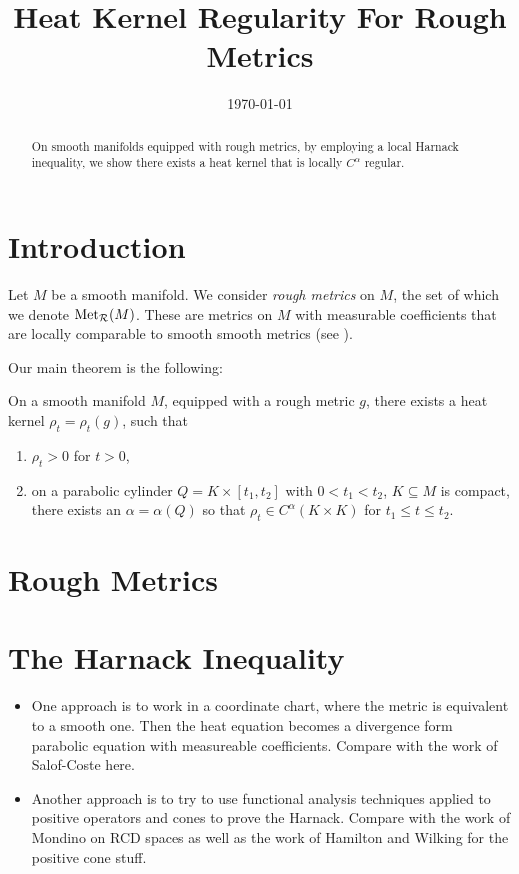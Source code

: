 \documentclass{amsart}
\begin{document}
\title[Heat Kernel Regularity]
 {Heat Kernel Regularity For Rough Metrics}

\curraddr{}
\email{}
\date{\today}

\dedicatory{}
\subjclass[2010]{}
\keywords{}

\begin{abstract}
On smooth manifolds equipped with rough metrics, by employing a local Harnack inequality, we show there exists a heat kernel that is locally $C^{\alpha}$ regular.
\end{abstract}

\maketitle

\section{Introduction}
\label{sec:intro}

Let \(M\) be a smooth manifold. We consider \emph{rough metrics} on \(M\), the set of which we denote \(\operatorname{Met}_{\operatorname{\mathcal{R}}} (M)\). These are metrics on \(M\) with measurable coefficients that are locally comparable to smooth smooth metrics (see ).

Our main theorem is the following:

\begin{thm}
On a smooth manifold \(M\), equipped with a rough metric \(g\), there exists a heat kernel \(\rho_t = \rho_t(g)\), such that
\begin{enumerate}
\item \(\rho_t > 0\) for \(t > 0\),
\item on a parabolic cylinder \(Q = K \times [t_1, t_2]\) with \(0 < t_1 < t_2\), \(K \subseteq M\) is compact, there exists an \(\alpha = \alpha(Q)\) so that \(\rho_t \in C^{\alpha}(K \times K)\) for \(t_1 \leq t \leq t_2\).
\end{enumerate}
\end{thm}

\section{Rough Metrics}
\label{sec:rough_metrics}


\section{The Harnack Inequality}
\label{sec:harnack}

\begin{itemize}
\item One approach is to work in a coordinate chart, where the metric is equivalent to a smooth one. Then the heat equation becomes a divergence form parabolic equation with measureable coefficients. Compare with the work of Salof-Coste here.
\item Another approach is to try to use functional analysis techniques applied to positive operators and cones to prove the Harnack. Compare with the work of Mondino on RCD spaces as well as the work of Hamilton and Wilking for the positive cone stuff.
\end{itemize}
\end{document}
